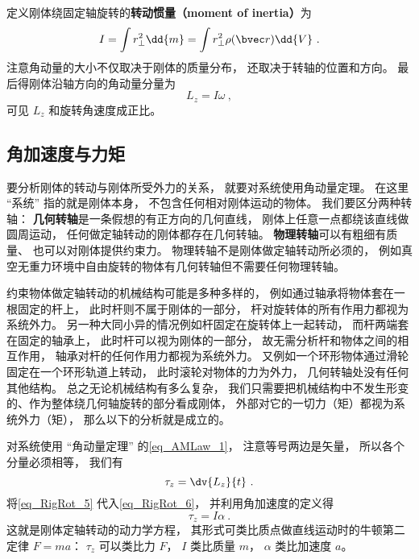 定义刚体绕固定轴旋转的\textbf{转动惯量（moment of inertia）}为
\begin{equation}
I = \int r_ \bot ^2 \dd{m} = \int r_ \bot ^2\rho(\bvec r) \dd{V} ~.
\end{equation}
注意角动量的大小不仅取决于刚体的质量分布， 还取决于转轴的位置和方向。 最后得刚体沿轴方向的角动量分量为
\begin{equation}\label{eq_RigRot_5}
L_z = I \omega ~,
\end{equation}
可见 $L_z$ 和旋转角速度成正比。

\subsection{角加速度与力矩}
要分析刚体的转动与刚体所受外力的关系， 就要对系统使用角动量定理。 在这里 “系统” 指的就是刚体本身， 不包含任何相对刚体运动的物体。 我们要区分两种转轴： \textbf{几何转轴}是一条假想的有正方向的几何直线， 刚体上任意一点都绕该直线做圆周运动， 任何做定轴转动的刚体都存在几何转轴。 \textbf{物理转轴}可以有粗细有质量、 也可以对刚体提供约束力。 物理转轴不是刚体做定轴转动所必须的， 例如真空无重力环境中自由旋转的物体有几何转轴但不需要任何物理转轴。

约束物体做定轴转动的机械结构可能是多种多样的， 例如通过轴承将物体套在一根固定的杆上， 此时杆则不属于刚体的一部分， 杆对旋转体的所有作用力都视为系统外力。 另一种大同小异的情况例如杆固定在旋转体上一起转动， 而杆两端套在固定的轴承上， 此时杆可以视为刚体的一部分， 故无需分析杆和物体之间的相互作用， 轴承对杆的任何作用力都视为系统外力。 又例如一个环形物体通过滑轮固定在一个环形轨道上转动， 此时滚轮对物体的力为外力， 几何转轴处没有任何其他结构。 总之无论机械结构有多么复杂， 我们只需要把机械结构中不发生形变的、作为整体绕几何轴旋转的部分看成刚体， 外部对它的一切力（矩）都视为系统外力（矩）， 那么以下的分析就是成立的。

对系统使用 “角动量定理” 的\autoref{eq_AMLaw_1}， 注意等号两边是矢量， 所以各个分量必须相等， 我们有
\begin{equation}\label{eq_RigRot_6}
\tau_z = \dv{L_z}{t}~.
\end{equation}
将\autoref{eq_RigRot_5} 代入\autoref{eq_RigRot_6}， 并利用角加速度的定义得
\begin{equation}\label{eq_RigRot_7}
\tau_z = I\alpha~.
\end{equation}
这就是刚体定轴转动的动力学方程， 其形式可类比质点做直线运动时的牛顿第二定律 $F = ma$： $\tau_z$ 可以类比力 $F$， $I$ 类比质量 $m$， $\alpha$ 类比加速度 $a$。

